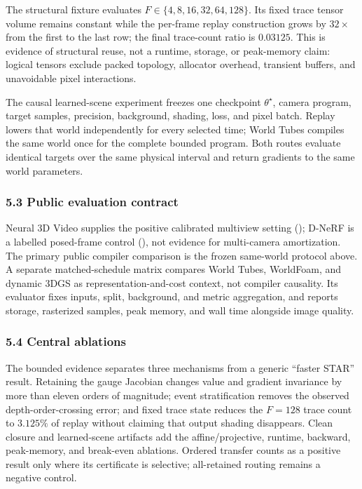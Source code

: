 \documentclass[
]{article}
\begin{document}
The structural fixture evaluates \(F\in\{4,8,16,32,64,128\}\). Its fixed
trace tensor volume remains constant while the per-frame replay
construction grows by \(32\times\) from the first to the last row; the
final trace-count ratio is \(0.03125\). This is evidence of structural
reuse, not a runtime, storage, or peak-memory claim: logical tensors
exclude packed topology, allocator overhead, transient buffers, and
unavoidable pixel interactions.

The causal learned-scene experiment freezes one checkpoint
\(\theta^\star\), camera program, target samples, precision, background,
shading, loss, and pixel batch. Replay lowers that world independently
for every selected time; World Tubes compiles the same world once for
the complete bounded program. Both routes evaluate identical targets
over the same physical interval and return gradients to the same world
parameters.

\subsubsection{5.3 Public evaluation
contract}\label{public-evaluation-contract}

Neural 3D Video supplies the positive calibrated multiview setting
(); D-NeRF is a
labelled posed-frame control (), not evidence for multi-camera amortization. The primary
public compiler comparison is the frozen same-world protocol above. A
separate matched-schedule matrix compares World Tubes, WorldFoam, and
dynamic 3DGS as representation-and-cost context, not compiler causality.
Its evaluator fixes inputs, split, background, and metric aggregation,
and reports storage, rasterized samples, peak memory, and wall time
alongside image quality.

\subsubsection{5.4 Central ablations}\label{central-ablations}

The bounded evidence separates three mechanisms from a generic ``faster
STAR'' result. Retaining the gauge Jacobian changes value and gradient
invariance by more than eleven orders of magnitude; event stratification
removes the observed depth-order-crossing error; and fixed trace state
reduces the \(F=128\) trace count to \(3.125\%\) of replay without
claiming that output shading disappears. Clean closure and learned-scene
artifacts add the affine/projective, runtime, backward, peak-memory, and
break-even ablations. Ordered transfer counts as a positive result only
where its certificate is selective; all-retained routing remains a
negative control.
\end{document}
